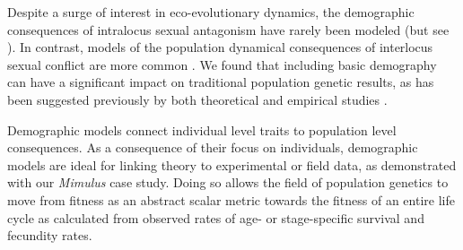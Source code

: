 \documentclass[11pt]{article}
\begin{document}
Despite a surge of interest in eco-evolutionary dynamics, the demographic consequences of intralocus sexual antagonism have rarely been modeled (but see \citealt{harts2014demography,kokko2003sexy, MatthewsConnallon2019}). In contrast, models of the population dynamical consequences of interlocus sexual conflict are more common \citep[e.g.,][]{tanaka1996sexual, martinez2017sexual}. We found that including basic demography can have a significant impact on traditional population genetic results, as has been suggested previously by both theoretical and empirical studies \citep{kokko2003sexy, berger2016intralocus, grieshop2017male}. 

Demographic models connect individual level traits to population level consequences. As a consequence of their focus on individuals, demographic models are ideal for linking theory to experimental or field data, as demonstrated with our \textit{Mimulus} case study. Doing so allows the field of population genetics to move from fitness as an abstract scalar metric towards the fitness of an entire life cycle as calculated from observed rates of age- or stage-specific survival and fecundity rates.  



 









\end{document}

